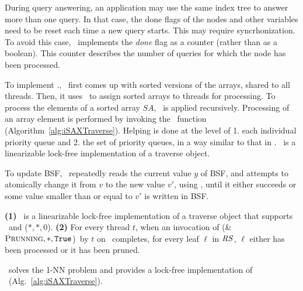     
    
    During query answering, an application may use the same index tree
    to answer more than one query. In that case, the done flags of the nodes and other
    variables need to be reset each time a new query starts. This may require syncrhonization. 
    To avoid this case, \Fresh\ implements the {\em done} flag as a counter (rather than as a boolean). 
    This counter describes the number of queries for which the node has been processed.
    
    To implement \RS.\Traverse, \Fresh\ first comes up with sorted versions of the arrays,
    shared to all threads. Then, it uses \Refresh\ to assign sorted arrays to threads 
    for processing. To process the elements of a sorted array $SA$, \Refresh\ is
    applied recursively. 
    Processing of an array element is performed by invoking the \Refinement\ function
    (Algorithm~\ref{alg:iSAXTraverse}). Helping is done at the level of 
    1. each individual priority queue and 
    2. the set of priority queues, in a way similar to that in \PS.
    \RS\ is a linearizable lock-free implementation of a traverse object. 
    
    To update BSF, \Fresh\ repeatedly reads the current value $y$ of BSF, and attempts to
    atomically change it from $v$ to the new value $v'$, using \CAS, until it either succeeds or some value 
    smaller than or equal to $v'$ is written in BSF.
    
    
    \begin{lemma}
    \label{lem:rs}
    {\bf (1)} \RS\ is a linearizable lock-free implementation of a traverse object that supports \Put\ and
    \Traverse($\mathit{*, *, 0}$). 
    {\bf (2)} For every thread $t$, when an invocation of \Traverse(\&$\mathit{\mbox{\sc Prunning}, *, \mbox{\texttt{True}}}$)\ by $t$ on \RS\ completes, 
    for every leaf $\ell$ in $\mbox{$\mathit{RS}$}$, $\ell$ either has been processed or it has been pruned.
    \end{lemma}
    
    \begin{theorem}
    \label{thm:qa}
    \Fresh\ solves the 1-NN problem and provides a lock-free implementation of \QueryAnswering\
    (Alg.~\ref{alg:iSAXTraverse}). 
    \end{theorem}